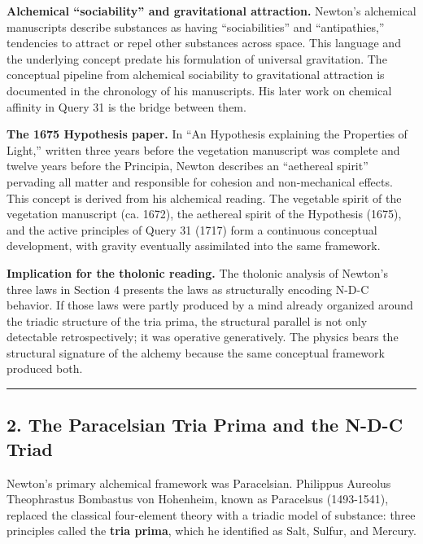 \documentclass[
  11pt,
  letterpaper,
]{article}
\begin{document}
\textbf{Alchemical ``sociability'' and gravitational attraction.}
Newton's alchemical manuscripts describe substances as having
``sociabilities'' and ``antipathies,'' tendencies to attract or repel
other substances across space. This language and the underlying concept
predate his formulation of universal gravitation. The conceptual
pipeline from alchemical sociability to gravitational attraction is
documented in the chronology of his manuscripts. His later work on
chemical affinity in Query 31 is the bridge between them.

\textbf{The 1675 Hypothesis paper.} In ``An Hypothesis explaining the
Properties of Light,'' written three years before the vegetation
manuscript was complete and twelve years before the Principia, Newton
describes an ``aethereal spirit'' pervading all matter and responsible
for cohesion and non-mechanical effects. This concept is derived from
his alchemical reading. The vegetable spirit of the vegetation
manuscript (ca. 1672), the aethereal spirit of the Hypothesis (1675),
and the active principles of Query 31 (1717) form a continuous
conceptual development, with gravity eventually assimilated into the
same framework.

\textbf{Implication for the tholonic reading.} The tholonic analysis of
Newton's three laws in Section 4 presents the laws as structurally
encoding N-D-C behavior. If those laws were partly produced by a mind
already organized around the triadic structure of the tria prima, the
structural parallel is not only detectable retrospectively; it was
operative generatively. The physics bears the structural signature of
the alchemy because the same conceptual framework produced both.

\begin{center}\rule{0.5\linewidth}{0.5pt}\end{center}

\subsection{2. The Paracelsian Tria Prima and the N-D-C
Triad}\label{the-paracelsian-tria-prima-and-the-n-d-c-triad}

Newton's primary alchemical framework was Paracelsian. Philippus
Aureolus Theophrastus Bombastus von Hohenheim, known as Paracelsus
(1493-1541), replaced the classical four-element theory with a triadic
model of substance: three principles called the \textbf{tria prima},
which he identified as Salt, Sulfur, and Mercury.
\end{document}
